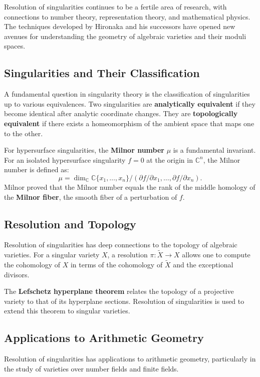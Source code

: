 Resolution of singularities continues to be a fertile area of research, with connections to number theory, representation theory, and mathematical physics. The techniques developed by Hironaka and his successors have opened new avenues for understanding the geometry of algebraic varieties and their moduli spaces.


\subsection*{Singularities and Their Classification}

A fundamental question in singularity theory is the classification of singularities up to various equivalences. Two singularities are \textbf{analytically equivalent} if they become identical after analytic coordinate changes. They are \textbf{topologically equivalent} if there exists a homeomorphism of the ambient space that maps one to the other.

For hypersurface singularities, the \textbf{Milnor number} $\mu$ is a fundamental invariant. For an isolated hypersurface singularity $f = 0$ at the origin in $\mathbb{C}^n$, the Milnor number is defined as:
\[
\mu = \dim_{\mathbb{C}} \mathbb{C}\{x_1, \ldots, x_n\} / (\partial f/\partial x_1, \ldots, \partial f/\partial x_n).
\]
Milnor proved that the Milnor number equals the rank of the middle homology of the \textbf{Milnor fiber}, the smooth fiber of a perturbation of $f$.

\subsection*{Resolution and Topology}

Resolution of singularities has deep connections to the topology of algebraic varieties. For a singular variety $X$, a resolution $\pi: \tilde{X} \to X$ allows one to compute the cohomology of $X$ in terms of the cohomology of $\tilde{X}$ and the exceptional divisors.

The \textbf{Lefschetz hyperplane theorem} relates the topology of a projective variety to that of its hyperplane sections. Resolution of singularities is used to extend this theorem to singular varieties.

\subsection*{Applications to Arithmetic Geometry}

Resolution of singularities has applications to arithmetic geometry, particularly in the study of varieties over number fields and finite fields.

